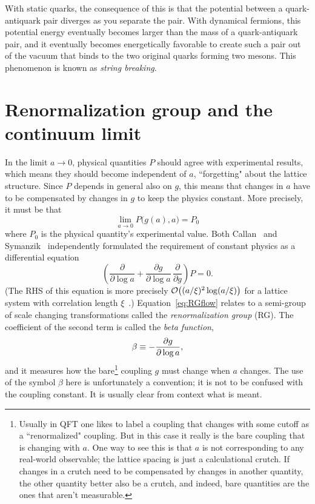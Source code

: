 With static quarks, the consequence of this is that
the potential between a quark-antiquark pair diverges as you separate the pair.
With dynamical fermions, this potential energy eventually becomes larger than
the mass of a quark-antiquark pair, and it eventually becomes energetically
favorable to create such a pair out of the vacuum that binds to the two original
quarks forming two mesons. This phenomenon is known as 
{\it string breaking}.


\section{Renormalization group and the continuum limit}


In the limit $a\to0$, physical quantities $P$ should agree with experimental
results, which means they should become independent of $a$, ``forgetting"
about the lattice structure. Since $P$ depends in general also on $g$,
this means that changes in $a$ have to be compensated by changes in $g$
to keep the physics constant. More precisely, it must be that 
\begin{equation}
  \lim_{a\to0}P\Big(g(a),a\Big)=P_0
\end{equation}
where $P_0$ is the physical quantity's experimental value.
Both Callan~\cite{callan_broken_1970} and
Symanzik~\cite{symanzik_small_1970,symanzik_small-distance-behaviour_1971}
independently formulated the requirement of constant physics as
a differential equation
\begin{equation}\label{eq:RGflow}
  \left(\frac{\partial}{\partial\log a}
        +\frac{\partial g}{\partial\log a}
         \,\frac{\partial}{\partial g}\right)P=0. 
\end{equation}
(The RHS of this equation is more precisely
$\order{(a/\xi)^2\log(a/\xi)}$ for a lattice system
with correlation length $\xi$~\cite{montvay_quantum_1994}.)
Equation~\eqref{eq:RGflow} relates to a semi-group of scale 
changing transformations called the {\it renormalization group} (RG). 
The coefficient of the second term is called the {\it beta function},
\begin{equation}\label{eq:betafunction}\index{beta function}
  \beta\equiv-\frac{\partial g}{\partial\log a},
\end{equation}
and it measures how the bare\footnote{Usually in QFT one likes to label
a coupling that changes with some cutoff as a ``renormalized" coupling.
But in this case it really is the bare coupling that is changing with $a$.
One way to see this is that $a$ is not corresponding to any real-world
observable; the lattice spacing is just a calculational crutch. If changes
in a crutch need to be compensated by changes in another quantity,
the other quantity better also be a crutch, and indeed, bare quantities
are the ones that aren't measurable.}
coupling $g$ must change when $a$ changes.
The use of the symbol $\beta$ here is unfortunately a convention; it
is not to be confused with the coupling constant. It is usually clear
from context what is meant. 


